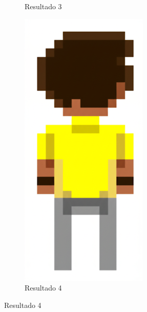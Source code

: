 \begin{figure}[htbp]
\begin{subfigure}{0.3\linewidth}
        \caption{\small Resultado 3}
        \label{fig:geminiProBack2c}
    \end{subfigure}
    \begin{subfigure}{0.3\linewidth}
        \includegraphics[width=1\linewidth]{figs/geminiPro/chat12/02_res4.png}
        \caption{\small Resultado 4}
        \label{fig:geminiProBack2d}
    \end{subfigure}
\end{figure}

